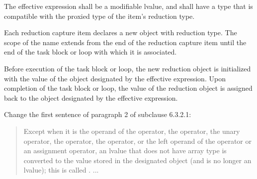 \pnum
The effective expression shall be a modifiable lvalue,
and shall have a type that is compatible with the proxied type
of the item's reduction type.


\pnum
Each reduction capture item declares a new object
with reduction type.
The scope of the name extends from the end of the reduction capture item
until the end of the task block or loop with which it is associated.

\pnum
Before execution of the task block or loop,
the new reduction object is initialized
with the value of the object designated by the effective expression.
Upon completion of the task block or loop,
the value of the reduction object is assigned back
to the object designated by the effective expression.

\pnum
Change the first sentence of paragraph 2 of subclause 6.3.2.1:

\begin{quote}
Except when it
is the operand of the  operator,
the  operator, the
unary \tcode{\&} operator,
the \tcode{++} operator,
the \tcode{--} operator,
or the left operand of the  operator
or an assignment operator,
an lvalue that does not have array type
is converted to the value stored in the designated object
(and is no longer an lvalue);
this is called
. ...
\end{quote}
